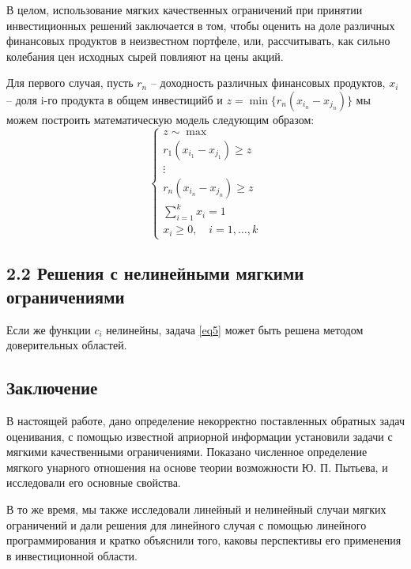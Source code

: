 \documentclass[12pt, a4paper, oneside]{article}
\begin{document}
			В целом, использование мягких качественных ограничений при принятии инвестиционных решений заключается в том, чтобы оценить на доле различных финансовых продуктов в неизвестном портфеле, или, рассчитывать, как сильно колебания цен исходных сырей повлияют на цены акций. 
			
			Для первого случая, пусть $r_n$ -- доходность различных финансовых продуктов, $x_i$ -- доля i-го продукта в общем инвестицийб и $z = \min\{r_n(x_{i_n}-x_{j_n})\}$ мы можем построить математическую модель следующим образом:
			\begin{equation*}
				\left\{
				\begin{array}{lr}
					z \sim \displaystyle\max\\
					r_1(x_{i_1}-x_{j_1}) \ge z\\
					\vdots\\
					r_n(x_{i_n}-x_{j_n}) \ge z\\
					\displaystyle\sum_{i=1}^{k}x_i = 1\\
					x_i \ge 0,\quad i = 1,\dots,k
				\end{array}
				\right.
			\end{equation*}
		\subsection{2.2 Решения с нелинейными мягкими ограничениями}
			Если же функции $c_i$ нелинейны, задача \eqref{eq5} может быть решена методом доверительных областей.

\newpage
	\begin{center}
		\section{Заключение}
	\end{center}

	В настоящей работе, дано определение некорректно поставленных обратных задач оценивания, с помощью известной априорной информации установили задачи с мягкими качественными ограничениями. Показано численное определение мягкого унарного отношения на основе теории возможности Ю. П. Пытьева, и исследовали его основные свойства.
	
	В то же время, мы также исследовали линейный и нелинейный случаи мягких ограничений и дали решения для линейного случая с помощью линейного программирования и кратко объяснили того, каковы перспективы его применения в инвестиционной области.
	
	~\\
	
\end{document}
